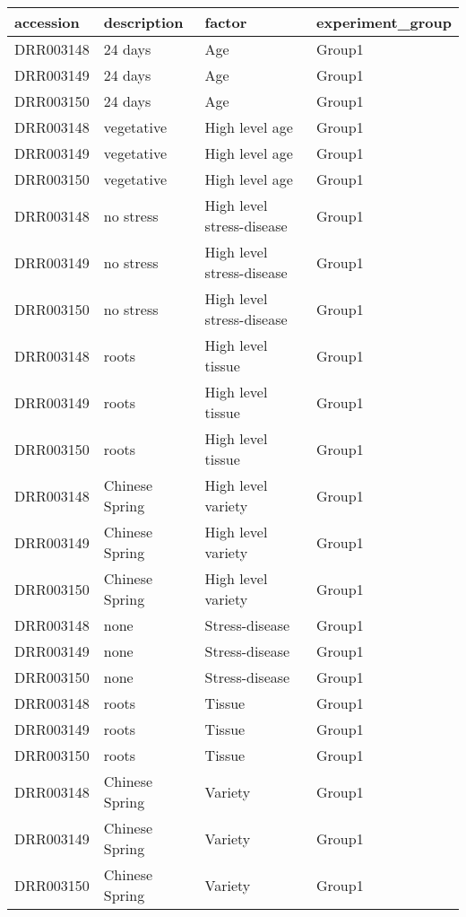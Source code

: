 \begin{tabular}{llll}
\toprule
 accession   & description    & factor                    & experiment\_group   \\
\midrule
 DRR003148   & 24 days        & Age                       & Group1            \\
 DRR003149   & 24 days        & Age                       & Group1            \\
 DRR003150   & 24 days        & Age                       & Group1            \\
 DRR003148   & vegetative     & High level age            & Group1            \\
 DRR003149   & vegetative     & High level age            & Group1            \\
 DRR003150   & vegetative     & High level age            & Group1            \\
 DRR003148   & no stress      & High level stress-disease & Group1            \\
 DRR003149   & no stress      & High level stress-disease & Group1            \\
 DRR003150   & no stress      & High level stress-disease & Group1            \\
 DRR003148   & roots          & High level tissue         & Group1            \\
 DRR003149   & roots          & High level tissue         & Group1            \\
 DRR003150   & roots          & High level tissue         & Group1            \\
 DRR003148   & Chinese Spring & High level variety        & Group1            \\
 DRR003149   & Chinese Spring & High level variety        & Group1            \\
 DRR003150   & Chinese Spring & High level variety        & Group1            \\
 DRR003148   & none           & Stress-disease            & Group1            \\
 DRR003149   & none           & Stress-disease            & Group1            \\
 DRR003150   & none           & Stress-disease            & Group1            \\
 DRR003148   & roots          & Tissue                    & Group1            \\
 DRR003149   & roots          & Tissue                    & Group1            \\
 DRR003150   & roots          & Tissue                    & Group1            \\
 DRR003148   & Chinese Spring & Variety                   & Group1            \\
 DRR003149   & Chinese Spring & Variety                   & Group1            \\
 DRR003150   & Chinese Spring & Variety                   & Group1            \\
\bottomrule
\end{tabular}

